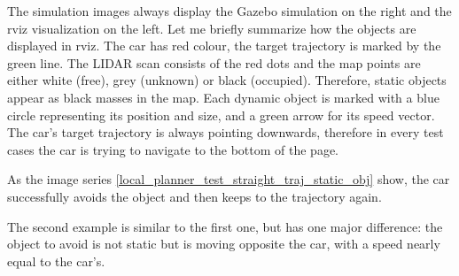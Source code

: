 The simulation images always display the Gazebo simulation on the right and the rviz visualization on the left. Let me briefly summarize how the objects are displayed in rviz. The car has red colour, the target trajectory is marked by the green line. The LIDAR scan consists of the red dots and the map points are either white (free), grey (unknown) or black (occupied). Therefore, static objects appear as black masses in the map. Each dynamic object is marked with a blue circle representing its position and size, and a green arrow for its speed vector. The car's target trajectory is always pointing downwards, therefore in every test cases the car is trying to navigate to the bottom of the page.

As the image series \ref{local_planner_test_straight_traj_static_obj} show, the car successfully avoids the object and then keeps to the trajectory again.

The second example is similar to the first one, but has one major difference: the object to avoid is not static but is moving opposite the car, with a speed nearly equal to the car's.

